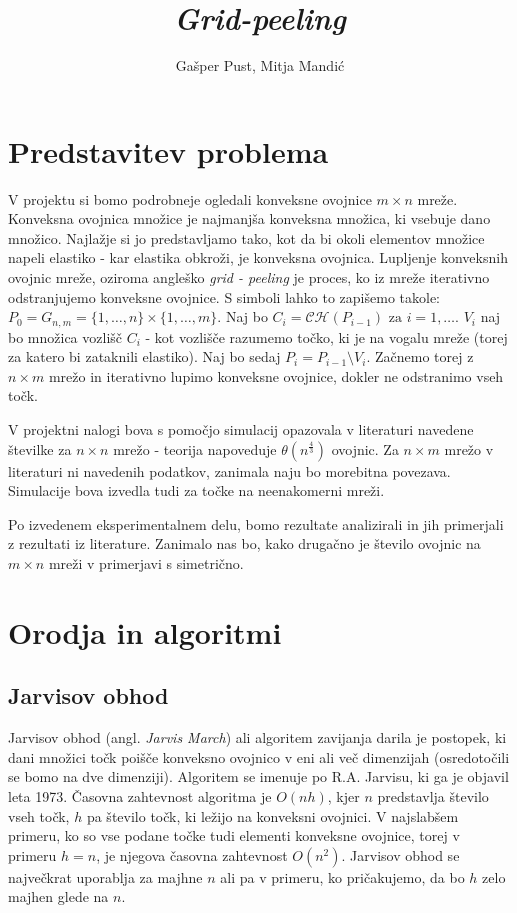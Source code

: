 \documentclass[a4paper]{article}
\title{\textit{Grid-peeling}}
\author{Gašper Pust, Mitja Mandić}
\begin{document}
\lstset{language=Python, breaklines=true, columns=fullflexible, basicstyle=\ttfamily}
\begin{titlepage}
 \maketitle
\end{titlepage}
%

\section{Predstavitev problema}
V projektu si bomo podrobneje ogledali konveksne ovojnice $m \times n$ mreže. Konveksna ovojnica množice je najmanjša konveksna množica, ki vsebuje dano množico.
Najlažje si jo predstavljamo tako, kot da bi okoli elementov množice napeli elastiko - kar elastika obkroži, je konveksna ovojnica. Lupljenje konveksnih ovojnic mreže,
oziroma angleško \textit{grid - peeling} je proces, ko iz mreže iterativno odstranjujemo konveksne ovojnice. S simboli lahko to zapišemo takole:
$ P_{0} = G_{n,m} = \{1,\ldots, n\} \times \{1, \ldots, m\}$. Naj bo $C_{i} = \mathcal{C}\mathcal{H}(P_{i-1}) \text{ za } i = 1, \ldots$. $V_{i}$ naj bo množica vozlišč $C_{i}$
- kot vozlišče razumemo točko, ki je na vogalu mreže (torej za katero bi zataknili elastiko). Naj bo sedaj $P_{i} = P_{i-1} \setminus V_{i}$. Začnemo torej z $n \times m$ mrežo 
in iterativno lupimo konveksne ovojnice, dokler ne odstranimo vseh točk.

V projektni nalogi bova s pomočjo simulacij opazovala v literaturi navedene številke za $n \times n$ mrežo - teorija napoveduje $\theta(n ^ \frac{4}{3})$ ovojnic.
Za $n \times m$ mrežo v literaturi ni navedenih podatkov, zanimala naju bo morebitna povezava. Simulacije bova izvedla tudi za točke na neenakomerni mreži.

Po izvedenem eksperimentalnem delu, bomo rezultate analizirali in jih primerjali z rezultati iz literature. Zanimalo nas bo, kako drugačno je število ovojnic na $m \times n$
mreži v primerjavi s simetrično.

\section{Orodja in algoritmi}
\subsection{Jarvisov obhod}
Jarvisov obhod (angl. \textit{Jarvis March}) ali algoritem zavijanja darila je postopek, ki dani množici točk poišče konveksno ovojnico v eni ali več dimenzijah (osredotočili se 
bomo na dve dimenziji). Algoritem se imenuje po R.A. Jarvisu, ki ga je objavil leta 1973. Časovna zahtevnost algoritma je $O(nh)$, kjer $n$ predstavlja število vseh točk, $h$ pa 
število točk, ki ležijo na konveksni ovojnici. V najslabšem primeru, ko so vse podane točke tudi elementi konveksne ovojnice, torej v primeru $h = n$, je njegova časovna zahtevnost 
$O(n^2)$. Jarvisov obhod se največkrat uporablja za majhne $n$ ali pa v primeru, ko pričakujemo, da bo $h$ zelo majhen glede na $n$.
\end{document}
